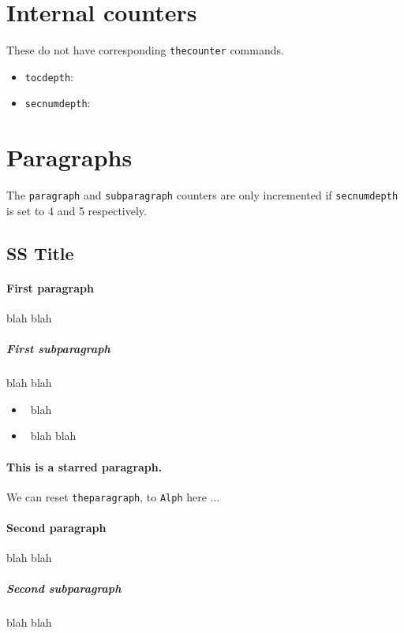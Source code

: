 \documentclass[oneside]{book}
\theoremstyle{plain}
\theoremstyle{definition}
\theoremstyle{remark}
\theoremstyle{mystyle}
\begin{document}
\section{Internal counters}
These do not have corresponding {\tt thecounter} commands.
\begin{itemize}
\item {\tt tocdepth}: 
\item {\tt secnumdepth}: 
\end{itemize}

\section{Paragraphs}
The {\tt paragraph} and {\tt subparagraph} counters are only incremented if {\tt secnumdepth} is set to 4 and 5 respectively.

\setcounter{secnumdepth}{5} 

\subsection{SS Title}

\paragraph{First paragraph} blah blah
\subparagraph{First subparagraph} blah blah

\begin{itemize}
\item \theparagraph\ blah %
\item \thesubparagraph\ blah blah %
\end{itemize}

\paragraph*{This is a starred paragraph.} We can reset {\tt theparagraph}, to {\tt Alph} here ...
\renewcommand{\theparagraph}{\Alph{paragraph}}

\paragraph{Second paragraph} blah blah
\subparagraph{Second subparagraph} blah blah
\end{document}
